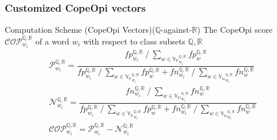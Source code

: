 \documentclass[mathserif]{beamer}
\DeclareMathOperator*{\divby}{/}
\begin{document}
\begin{frame}
\frametitle{Customized CopeOpi vectors}
\begin{block}{Computation Scheme (CopeOpi Vectors)($\mathbb{Q}$-against-$\mathbb{R}$)}
The CopeOpi score $\mathcal{COP}^{\mathbb{Q},\mathbb{R}}_{w_i}$ of a word $w_i$ with respect to class subsets $\mathbb{Q},\mathbb{R}$
\begin{equation*}
\begin{gathered}
\mathcal{P}^{\mathbb{Q},\mathbb{R}}_{w_i} = \dfrac {
	fp^{\mathbb{Q},\mathbb{R}}_{w_i} \divby \sum_{w \in {\mathbb{V}_\mathbb{P}}^{\mathbb{Q},\mathbb{R}}_{w_i}} fp^{\mathbb{Q},\mathbb{R}}_w
}{
	fp^{\mathbb{Q},\mathbb{R}}_{w_i} \divby \sum_{w \in {\mathbb{V}_\mathbb{P}}^{\mathbb{Q},\mathbb{R}}_{w_i}} fp^{\mathbb{Q},\mathbb{R}}_w +
	fn^{\mathbb{Q},\mathbb{R}}_{w_i} \divby \sum_{w \in {\mathbb{V}_\mathbb{N}}^{\mathbb{Q},\mathbb{R}}_{w_i}} fn^{\mathbb{Q},\mathbb{R}}_w
}
\\
\mathcal{N}^{\mathbb{Q},\mathbb{R}}_{w_i} = \dfrac {
	fn^{\mathbb{Q},\mathbb{R}}_{w_i} \divby \sum_{w \in {\mathbb{V}_\mathbb{N}}^{\mathbb{Q},\mathbb{R}}_{w_i}} fn^{\mathbb{Q},\mathbb{R}}_w
}{
	fp^{\mathbb{Q},\mathbb{R}}_{w_i} \divby \sum_{w \in {\mathbb{V}_\mathbb{P}}^{\mathbb{Q},\mathbb{R}}_{w_i}} fp^{\mathbb{Q},\mathbb{R}}_w +
	fn^{\mathbb{Q},\mathbb{R}}_{w_i} \divby \sum_{w \in {\mathbb{V}_\mathbb{N}}^{\mathbb{Q},\mathbb{R}}_{w_i}} fn^{\mathbb{Q},\mathbb{R}}_w
}
\\
\mathcal{COP}^{\mathbb{Q},\mathbb{R}}_{w_i} = \mathcal{P}^{\mathbb{Q},\mathbb{R}}_{w_i} - \mathcal{N}^{\mathbb{Q},\mathbb{R}}_{w_i}
\end{gathered}
\end{equation*}
\end{block}
\begin{flushright}
\vspace{-9.5ex}
\end{flushright}
\end{frame}
\end{document}
